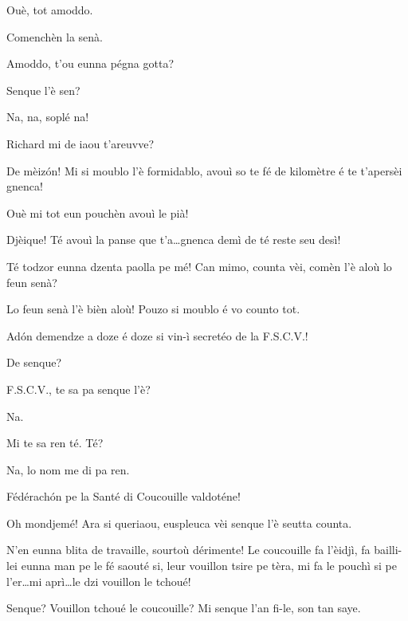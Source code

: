 \begin{drama}
\Tuenospeaks Ouè, tot amoddo.

\Richardspeaks Comenchèn la senà.

\Gerominespeaks Amoddo,  t'ou eunna pégna gotta?

\Richardspeaks Senque l'è sen?


\Richardspeaks Na, na, soplé na!

\Tuenospeaks{} Richard mi de iaou t'areuvve? 

\Richardspeaks De mèiz\'on! Mi si moublo l'è formidablo, avouì so te fé de kilomètre é te t'apersèi gnenca! 

\Tuenospeaks Ouè mi tot eun pouchèn avouì le pià!

\Richardspeaks Djèique! Té avouì la panse que t'a\ldots  gnenca demì de té reste seu desì!

\Tuenospeaks{} Té todzor eunna dzenta paolla pe mé! Can mimo, counta vèi, comèn l'è aloù lo feun senà?

\Richardspeaks Lo feun senà l'è bièn aloù! Pouzo si moublo é vo counto tot.


\Richardspeaks Ad\'on demendze a doze é doze si vin-ì secretéo de la F.S.C.V.!

\Tcheuttespeaks De senque?

\Richardspeaks{} F.S.C.V., te sa pa senque l'è?

\Tuenospeaks Na.

\Richardspeaks Mi te sa ren té. Té?

\Gerominespeaks Na, lo nom me di pa ren.

\Richardspeaks Fédérach\'on pe la Santé di Coucouille valdoténe!

\Tuenospeaks Oh mondjemé! Ara si queriaou, euspleuca vèi senque l'è seutta counta.

\Richardspeaks N'en eunna blita de travaille, sourtoù dérimente! Le coucouille fa l'èidjì, fa bailli-lei eunna man pe le fé saouté si, leur  vouillon tsire pe tèra, mi fa le pouchì si pe l'er\ldots mi aprì\ldots le dzi vouillon le tchoué!

\Gerominespeaks Senque? Vouillon tchoué le coucouille? Mi senque l'an fi-le, son tan saye.


\end{drama}
